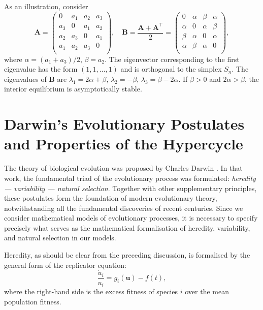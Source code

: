 \documentclass[12pt]{report}
\theoremstyle{definition}
\theoremstyle{remark}
\begin{document}
As an illustration, consider
\[
  \mathbf{A}=
  \begin{pmatrix}
    0 & a_1 & a_2 & a_3\\
    a_3 & 0 & a_1 & a_2\\
    a_2 & a_3 & 0 & a_1\\
    a_1 & a_2 & a_3 & 0\\
  \end{pmatrix},\quad
  \mathbf{B}=\frac{\mathbf{A}+\mathbf{A}^{\top}}{2}=
  \begin{pmatrix}
    0 & \alpha & \beta & \alpha\\
    \alpha & 0 & \alpha & \beta\\
    \beta & \alpha & 0 & \alpha\\
    \alpha & \beta & \alpha & 0\\
  \end{pmatrix},
\]
where $\alpha=(a_1+a_3)/2$, $\beta=a_2$. 
The eigenvector corresponding to the first eigenvalue has the form
$(1,1,\ldots,1)$ and is orthogonal to the simplex $S_n$.
The eigenvalues of $\mathbf{B}$ are
$\lambda_{1}=2\alpha+\beta$, $\lambda_{2}=-\beta$,
$\lambda_{3}=\beta-2\alpha$.
If $\beta>0$ and $2\alpha>\beta$, the interior equilibrium is
asymptotically stable.

\section{Darwin's Evolutionary Postulates and Properties of the Hypercycle}
\label{c1:section:1.3}

The theory of biological evolution was proposed by Charles Darwin
\cite{c1:Darwin1859}.  In that work, the fundamental triad of the
evolutionary process was formulated: \textit{heredity —
variability — natural selection}.  Together with other supplementary
principles, these postulates form the foundation of modern evolutionary
theory, notwithstanding all the fundamental discoveries of recent
centuries.  Since we consider mathematical models of evolutionary
processes, it is necessary to specify precisely what serves as the
mathematical formalisation of heredity, variability, and natural
selection in our models.

Heredity, as should be clear from the preceding discussion, is
formalised by the general form of the replicator equation:
\[
  \frac{\dot{u}_{i}}{u_{i}}=g_{i}(\mathbf{u})-f(t),
\]
where the right-hand side is the excess fitness of species $i$ over
the mean population fitness.
\end{document}
